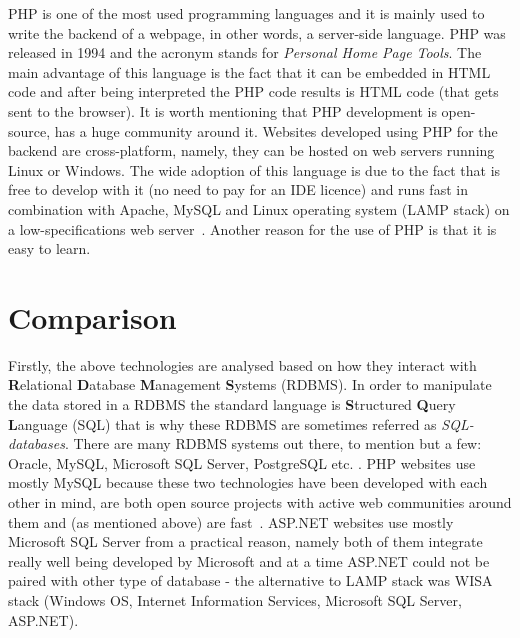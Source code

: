 \documentclass[11]{article}
\begin{document}
	PHP is one of the most used programming languages \citep{cass2014top, cass20152015} and it is mainly used to write the backend of a webpage, in other words,  a server-side language. PHP was released in 1994 and the acronym stands for \textit{Personal Home Page Tools}. The main advantage of this language is the fact that it can be embedded in HTML code and after being interpreted the PHP code results is HTML code (that gets sent to the browser). It is worth mentioning that PHP development is  open-source, has a huge community around it. Websites developed using PHP for the backend are cross-platform, namely, they can be hosted on web servers running Linux or Windows. The wide adoption of this language is due to the fact that is free to develop with it (no need to pay for an IDE licence) and runs fast in combination with Apache, MySQL and Linux operating system (LAMP stack) on a low-specifications web server~\citep{converse2004php5}. Another reason for the use of PHP is that it is easy to learn.

\pagebreak

\section{Comparison}

	Firstly, the above technologies are analysed based on how they interact with \textbf{R}elational \textbf{D}atabase \textbf{M}anagement \textbf{S}ystems (RDBMS). In order to manipulate the data stored in a RDBMS the standard language is \textbf{S}tructured \textbf{Q}uery \textbf{L}anguage (SQL) that is why these RDBMS are sometimes referred as \textit{SQL-databases}. There are many RDBMS systems out there, to mention but a few: Oracle, MySQL, Microsoft SQL Server, PostgreSQL etc. . PHP websites use mostly MySQL because these two technologies have been developed with each other in mind, are both open source projects with active web communities around them and (as mentioned above) are fast~\citep{davis2007learning}. ASP.NET websites use mostly Microsoft SQL Server from a practical reason, namely both of them integrate really well being developed by Microsoft and at a time ASP.NET could not be paired with other type of database - the alternative to LAMP stack was WISA stack (Windows OS, Internet Information Services, Microsoft SQL Server, ASP.NET).
\end{document}
